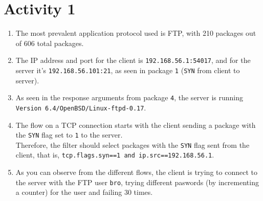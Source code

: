 \section*{Activity 1}
\begin{enumerate}
    \item The most prevalent application protocol used is FTP, with 210 packages out of 606 total packages.
    \item The IP address and port for the client is \texttt{192.168.56.1:54017}, and for the server it's \texttt{192.168.56.101:21}, as seen in package \texttt{1} (\texttt{SYN} from client to server).
    \item As seen in the response arguments from package \texttt{4}, the server is running \texttt{Version 6.4/OpenBSD/Linux-ftpd-0.17}.
    \item The flow on a TCP connection starts with the client sending a package with the \texttt{SYN} flag set to \texttt{1} to the server.\\
    Therefore, the filter should select packages with the \texttt{SYN} flag sent from the client, that is, \texttt{tcp.flags.syn==1 and ip.src==192.168.56.1}.
    \item As you can observe from the different flows, the client is trying to connect to the server with the FTP user \texttt{bro}, trying different paswords (by incrementing a counter) for the user and failing 30 times.
\end{enumerate}

